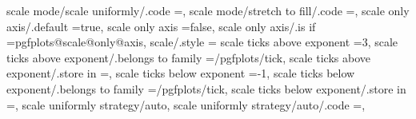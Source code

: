 {{{{{{{scale mode/scale uniformly/.code                                   ={\def\pgfplots@scale@mode@choice{3}},                                                                                              
scale mode/stretch to fill/.code                                   ={\def\pgfplots@scale@mode@choice{2}},                                                                                              
scale only axis/.default                                           =true,                                                                                                                              
scale only axis                                                    =false,                                                                                                                             
scale only axis/.is if                                             =pgfplots@scale@only@axis,                                                                                                          
scale/.style                                                       ={                                                                                                                                 
scale ticks above exponent                                         =3,                                                                                                                                 
scale ticks above exponent/.belongs to family                      =/pgfplots/tick,                                                                                                                    
scale ticks above exponent/.store in                               =\pgfplots@scale@ticks@above@exponent,                                                                                              
scale ticks below exponent                                         =-1,                                                                                                                                
scale ticks below exponent/.belongs to family                      =/pgfplots/tick,                                                                                                                    
scale ticks below exponent/.store in                               =\pgfplots@scale@ticks@below@exponent,                                                                                              
scale uniformly strategy/auto,
scale uniformly strategy/auto/.code                                ={\def\pgfplots@scaleuniformly@choice{0}},                                                                                          
}}}}}}}}
